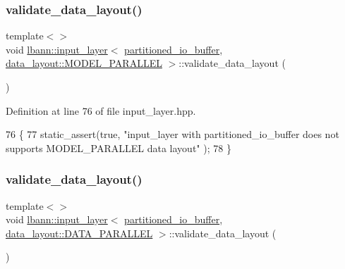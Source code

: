 \subsubsection{\texorpdfstring{validate\+\_\+data\+\_\+layout()}{validate\_data\_layout()}\hspace{0.1cm}{\footnotesize\ttfamily [2/5]}}
{\footnotesize\ttfamily template$<$$>$ \\
void \hyperlink{classlbann_1_1input__layer}{lbann\+::input\+\_\+layer}$<$ \hyperlink{classlbann_1_1partitioned__io__buffer}{partitioned\+\_\+io\+\_\+buffer}, \hyperlink{base_8hpp_a786677cbfb3f5677b4d84f3056eb08dbac94d7b0e44ab8bdcdad694a673cdeae0}{data\+\_\+layout\+::\+M\+O\+D\+E\+L\+\_\+\+P\+A\+R\+A\+L\+L\+EL} $>$\+::validate\+\_\+data\+\_\+layout (\begin{DoxyParamCaption}{ }\end{DoxyParamCaption})\hspace{0.3cm}{\ttfamily [inline]}}



Definition at line 76 of file input\+\_\+layer.\+hpp.


\begin{DoxyCode}
76                                                                                                 \{
77   static\_assert(\textcolor{keyword}{true}, \textcolor{stringliteral}{"input\_layer with partitioned\_io\_buffer does not supports MODEL\_PARALLEL data layout"}
      );
78 \}
\end{DoxyCode}
\mbox{\label{classlbann_1_1input__layer_a129f797705ae7584d6bc612b15aeb294}} 
\subsubsection{\texorpdfstring{validate\+\_\+data\+\_\+layout()}{validate\_data\_layout()}\hspace{0.1cm}{\footnotesize\ttfamily [3/5]}}
{\footnotesize\ttfamily template$<$$>$ \\
void \hyperlink{classlbann_1_1input__layer}{lbann\+::input\+\_\+layer}$<$ \hyperlink{classlbann_1_1partitioned__io__buffer}{partitioned\+\_\+io\+\_\+buffer}, \hyperlink{base_8hpp_a786677cbfb3f5677b4d84f3056eb08dba37d2a3465f7cbf4ab60f4e79944d0638}{data\+\_\+layout\+::\+D\+A\+T\+A\+\_\+\+P\+A\+R\+A\+L\+L\+EL} $>$\+::validate\+\_\+data\+\_\+layout (\begin{DoxyParamCaption}{ }\end{DoxyParamCaption})\hspace{0.3cm}{\ttfamily [inline]}}



